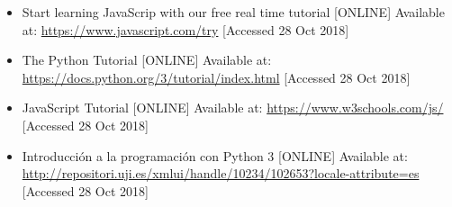 \documentclass[a4paper]{article}
\begin{document}
\begin{itemize}
   \item Start learning JavaScrip with our free real time tutorial [ONLINE] Available at:
      \url{https://www.javascript.com/try} [Accessed 28 Oct 2018]
\end{itemize}

\begin{itemize}
   \item The Python Tutorial [ONLINE] Available at:
      \url{https://docs.python.org/3/tutorial/index.html} [Accessed 28 Oct 2018]
\end{itemize}

\begin{itemize}
   \item JavaScript Tutorial [ONLINE] Available at:
      \url{https://www.w3schools.com/js/} [Accessed 28 Oct 2018]
\end{itemize}

\begin{itemize}
   \item Introducción a la programación con Python 3 [ONLINE] Available at:
      \url{http://repositori.uji.es/xmlui/handle/10234/102653?locale-attribute=es} [Accessed 28 Oct 2018]
\end{itemize}
\end{document}
